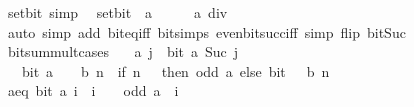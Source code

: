 \begin{isabellebody}
\endisatagproof
{\isafoldproof}%
%
\isadelimproof
\isanewline
%
\endisadelimproof
\isanewline
{}\isamarkupfalse%
\ set{\isacharunderscore}{\kern0pt}bit{\isacharunderscore}{\kern0pt}{}\ {\isacharbrackleft}{\kern0pt}simp{\isacharbrackright}{\kern0pt}{\isacharcolon}{\kern0pt}\isanewline
\ \ {\isacartoucheopen}set{\isacharunderscore}{\kern0pt}bit\ {}\ a\ {\isacharequal}{\kern0pt}\ {}\ {\isacharplus}{\kern0pt}\ {}\ {\isacharasterisk}{\kern0pt}\ {\isacharparenleft}{\kern0pt}a\ div\ {}{\isacharparenright}{\kern0pt}{\isacartoucheclose}\isanewline
%
\isadelimproof
\ \ %
\endisadelimproof
%
\isatagproof
{}\isamarkupfalse%
\ {\isacharparenleft}{\kern0pt}auto\ simp\ add{\isacharcolon}{\kern0pt}\ bit{\isacharunderscore}{\kern0pt}eq{\isacharunderscore}{\kern0pt}iff\ bit{\isacharunderscore}{\kern0pt}simps\ even{\isacharunderscore}{\kern0pt}bit{\isacharunderscore}{\kern0pt}succ{\isacharunderscore}{\kern0pt}iff\ simp\ flip{\isacharcolon}{\kern0pt}\ bit{\isacharunderscore}{\kern0pt}Suc{\isacharparenright}{\kern0pt}%
\endisatagproof
{\isafoldproof}%
%
\isadelimproof
\isanewline
%
\endisadelimproof
\isanewline
{}\isamarkupfalse%
\ bit{\isacharunderscore}{\kern0pt}sum{\isacharunderscore}{\kern0pt}mult{\isacharunderscore}{\kern0pt}{}{\isacharunderscore}{\kern0pt}cases{\isacharcolon}{\kern0pt}\isanewline
\ \ \ a{\isacharcolon}{\kern0pt}\ {\isachardoublequoteopen}{\isasymforall}j{\isachardot}{\kern0pt}\ {\isasymnot}\ bit\ a\ {\isacharparenleft}{\kern0pt}Suc\ j{\isacharparenright}{\kern0pt}{\isachardoublequoteclose}\isanewline
\ \ \ {\isachardoublequoteopen}bit\ {\isacharparenleft}{\kern0pt}a\ {\isacharplus}{\kern0pt}\ {}\ {\isacharasterisk}{\kern0pt}\ b{\isacharparenright}{\kern0pt}\ n\ {\isacharequal}{\kern0pt}\ {\isacharparenleft}{\kern0pt}if\ n\ {\isacharequal}{\kern0pt}\ {}\ then\ odd\ a\ else\ bit\ {\isacharparenleft}{\kern0pt}{}\ {\isacharasterisk}{\kern0pt}\ b{\isacharparenright}{\kern0pt}\ n{\isacharparenright}{\kern0pt}{\isachardoublequoteclose}\isanewline
%
\isadelimproof
%
\endisadelimproof
%
\isatagproof
{}\isamarkupfalse%
\ {\isacharminus}{\kern0pt}\isanewline
\ \ \isamarkupfalse%
\ a{\isacharunderscore}{\kern0pt}eq{\isacharcolon}{\kern0pt}\ {\isachardoublequoteopen}bit\ a\ i\ {\isasymlongleftrightarrow}\ i\ {\isacharequal}{\kern0pt}\ {}\ {\isasymand}\ odd\ a{\isachardoublequoteclose}\ \ i\isanewline
\ \ \ \ \isamarkupfalse%

\end{isabellebody}
